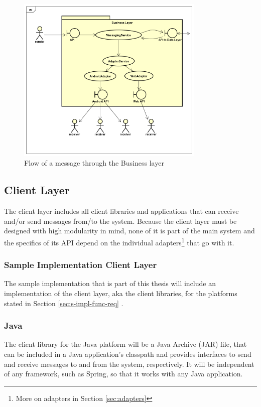 \begin{figure}[H]
	\centering
	\includegraphics[width=0.8\textwidth]{figures/03_design/msg-flow}
    \caption{Flow of a message through the Business layer}
    \label{fig:msg-flow}
\end{figure}

\subsection{Client Layer}
The client layer includes all client libraries and applications that can receive and/or send messages from/to the system. Because the client layer must be designed with high modularity in mind, none of it is part of the main system and the specifics of its API depend on the individual adapters\footnote{More on adapters in Section \ref{sec:adapters}} that go with it.

\subsubsection{Sample Implementation Client Layer}
The sample implementation that is part of this thesis will include an implementation of the client layer, aka the client libraries, for the platforms stated in Section \ref{sec:s-impl-func-req} .
\subsubsection*{Java}
The client library for the Java platform will be a Java Archive (JAR) file, that can be included in a Java application's classpath and provides interfaces to send and receive messages to and from the system, respectively. It will be independent of any framework, such as Spring, so that it works with any Java application.

